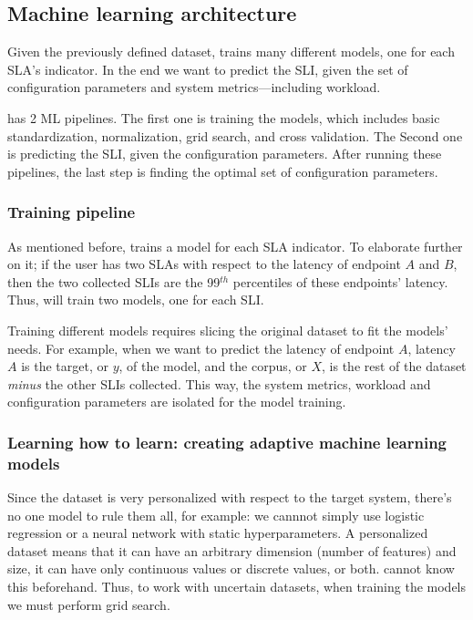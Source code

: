\subsection{Machine learning architecture}

Given the previously defined dataset, \projectname{} trains many different models, one for each SLA's indicator. In the end we want to predict the SLI, given the set of configuration parameters and system metrics---including workload. 

\projectname{} has 2 ML pipelines. The first one is training the models, which includes basic standardization, normalization, grid search, and cross validation. The Second one is predicting the SLI, given the configuration parameters. After running these pipelines, the last step is finding the optimal set of configuration parameters.

\subsubsection{Training pipeline}

As mentioned before, \projectname{} trains a model for each SLA indicator. To elaborate further on it;  if the user has two SLAs with respect to the latency of endpoint $A$ and $B$, then the two collected SLIs are the 99$^{th}$ percentiles of these endpoints' latency. Thus, \projectname{} will train two models, one for each SLI.

Training different models requires slicing the original dataset to fit the models' needs. For example, when we want to predict the latency of endpoint $A$, latency $A$ is the target, or $y$, of the model, and the corpus, or $X$, is the rest of the dataset \textit{minus} the other SLIs collected. This way, the system metrics, workload and configuration parameters are isolated for the model training.

\subsubsection{Learning how to learn: creating adaptive machine learning models}

Since the dataset is very personalized with respect to the target system, there's no one model to rule them all, for example: we cannnot simply use logistic regression or a neural network with static hyperparameters. A personalized dataset means that it can have an arbitrary dimension (number of features) and size, it can have only continuous values or discrete values, or both. \projectname{} cannot know this beforehand. Thus, to work with uncertain datasets, when training the models we must perform grid search.

